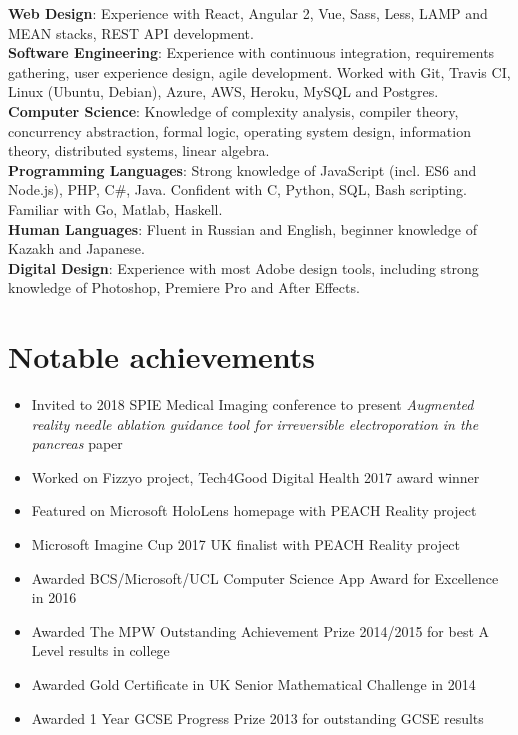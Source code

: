 \documentclass{article}
\begin{document}
\begin{multicols}{2}
\textbf{Web Design}: Experience with React, Angular 2, Vue, Sass, Less, LAMP and MEAN stacks, REST API development.
\vspace{2mm} \\
\textbf{Software Engineering}: Experience with continuous integration, requirements gathering, user experience design, agile development. Worked with Git, Travis CI, Linux (Ubuntu, Debian), Azure, AWS, Heroku, MySQL and Postgres.
\vspace{2mm} \\
\textbf{Computer Science}: Knowledge of complexity analysis, compiler theory, concurrency abstraction, formal logic, operating system design, information theory, distributed systems, linear algebra.
\vspace{2mm} \\
\textbf{Programming Languages}: Strong knowledge of JavaScript (incl. ES6 and Node.js), PHP, C\#, Java. Confident with C, Python, SQL, Bash scripting. Familiar with Go, Matlab, Haskell.
\vspace{2mm} \\
\textbf{Human Languages}: Fluent in Russian and English, beginner knowledge of Kazakh and Japanese.
\vspace{2mm} \\
\textbf{Digital Design}: Experience with most Adobe design tools, including strong knowledge of Photoshop, Premiere Pro and After Effects.

\section*{\normalfont Notable achievements}

\begin{itemize}
    \item Invited to 2018 SPIE Medical Imaging conference to present \textit{Augmented reality needle ablation guidance tool for irreversible electroporation in the pancreas} paper
    \item Worked on Fizzyo project, Tech4Good Digital Health 2017 award winner
    \item Featured on Microsoft HoloLens homepage with PEACH Reality project
	\item Microsoft Imagine Cup 2017 UK finalist with PEACH Reality project
    \item Awarded BCS/Microsoft/UCL Computer Science App Award for Excellence in 2016
    \item Awarded The MPW Outstanding Achievement Prize 2014/2015 for best A Level results in college
    \item Awarded Gold Certificate in UK Senior Mathematical Challenge in 2014
    \item Awarded 1 Year GCSE Progress Prize 2013 for outstanding GCSE results
\end{itemize}


\end{multicols}
\end{document}
